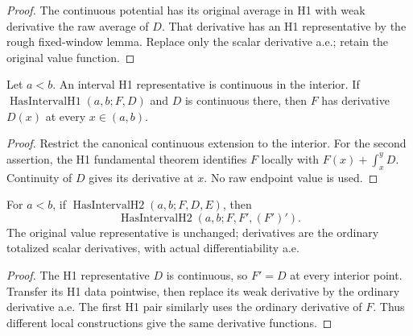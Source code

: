 \begin{proof}
\leanok
The continuous potential has its original average in H1 with weak
derivative the raw average of $D$.
That derivative has an H1 representative by the rough fixed-window lemma.
Replace only the scalar derivative a.e.; retain the original value function.
\end{proof}

\begin{lemma}
\label{lem:interval-h1-continuous-derivative}
\leanok
Let $a<b$. An interval H1 representative is continuous in the interior.
If $\operatorname{HasIntervalH1}(a,b;F,D)$ and $D$ is continuous there,
then $F$ has derivative $D(x)$ at every $x\in(a,b)$.
\end{lemma}

\begin{proof}
\leanok
Restrict the canonical continuous extension to the interior.
For the second assertion, the H1 fundamental theorem identifies $F$ locally
with $F(x)+\int_x^yD$. Continuity of $D$ gives its derivative at $x$.
No raw endpoint value is used.
\end{proof}

\begin{lemma}
\label{lem:interval-h2-canonical-derivatives}
\leanok
For $a<b$, if $\operatorname{HasIntervalH2}(a,b;F,D,E)$, then
\[
 \operatorname{HasIntervalH2}(a,b;F,F', (F')').
\]
The original value representative is unchanged; derivatives are the ordinary
totalized scalar derivatives, with actual differentiability a.e.
\end{lemma}

\begin{proof}
\leanok
The H1 representative $D$ is continuous, so $F'=D$ at every interior point.
Transfer its H1 data pointwise, then replace its weak derivative by the ordinary
derivative a.e. The first H1 pair similarly uses the ordinary derivative of $F$.
Thus different local constructions give the same derivative functions.
\end{proof}

